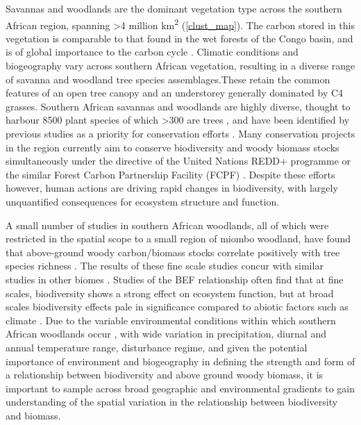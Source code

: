 \documentclass[11pt,a4paper]{article}
\newcommand{\textapprox}{\raisebox{0.5ex}{\texttildelow}}  %
\begin{document}
Savannas and woodlands are the dominant vegetation type across the southern African region, spanning >4 million km\textsuperscript{2} \citep{White1987, Ratnam2011, Ryan2016} (\autoref{clust_map}). The carbon stored in this vegetation is comparable to that found in the wet forests of the Congo basin, and is of global importance to the carbon cycle \citep{Houghton2009, Mayaux2008}. Climatic conditions and biogeography vary across southern African vegetation, resulting in a diverse range of savanna and woodland tree species assemblages.These retain the common features of an open tree canopy and an understorey generally dominated by C4 grasses. Southern African savannas and woodlands are highly diverse, thought to harbour \textapprox{}8500 plant species of which >300 are trees \citep{Frost1996}, and have been identified by previous studies as a priority for conservation efforts \citep{Byers2001, Mittermeier2003}. Many conservation projects in the region currently aim to conserve biodiversity and woody biomass stocks simultaneously under the directive of the United Nations REDD+ programme or the similar Forest Carbon Partnership Facility (FCPF) \citep{Hinsley2015}. Despite these efforts however, human actions are driving rapid changes in biodiversity, with largely unquantified consequences for ecosystem structure and function.

A small number of studies in southern African woodlands, all of which were restricted in the spatial scope to a small region of miombo woodland, have found that above-ground woody carbon/biomass stocks correlate positively with tree species richness \citep{McNicol2018, Shirima2015, Mutowo2012}. The results of these fine scale studies concur with similar studies in other biomes \citep{Cardinale2009}. Studies of the BEF relationship often find that at fine scales, biodiversity shows a strong effect on ecosystem function, but at broad scales biodiversity effects pale in significance compared to abiotic factors such as climate \citep{Pasari2013}. Due to the variable environmental conditions within which southern African woodlands occur \citep{Frost1996}, with wide variation in precipitation, diurnal and annual temperature range, disturbance regime, and given the potential importance of environment and biogeography in defining the strength and form of a relationship between biodiversity and above ground woody biomass, it is important to sample across broad geographic and environmental gradients to gain understanding of the spatial variation in the relationship between biodiversity and biomass. 
\end{document}
